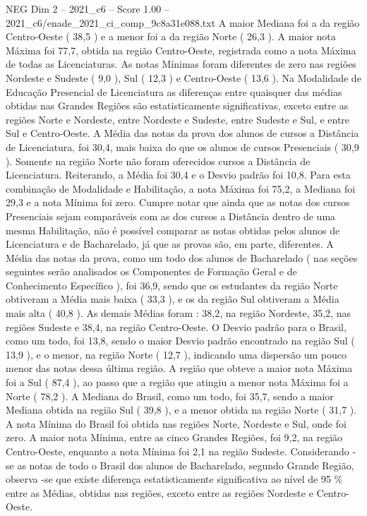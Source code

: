 \begin{textsample}{NEG Dim 2 – 2021\_c6 – Score 1.00 – 2021\_c6/enade\_2021\_ci\_comp\_9c8a31e088.txt}
A maior Mediana foi a da região Centro-Oeste ( 38,5 ) e a menor foi a da região Norte ( 26,3 ).
A maior nota Máxima foi 77,7, obtida na região Centro-Oeste, registrada como a nota Máxima de todas as Licenciaturas.
As notas Mínimas foram diferentes de zero nas regiões Nordeste e Sudeste ( 9,0 ), Sul ( 12,3 ) e Centro-Oeste ( 13,6 ).
Na Modalidade de Educação Presencial de Licenciatura as diferenças entre quaisquer das médias obtidas nas Grandes Regiões são estatisticamente significativas, exceto entre as regiões Norte e Nordeste, entre Nordeste e Sudeste, entre Sudeste e Sul, e entre Sul e Centro-Oeste.
A Média das notas da prova dos alunos de cursos a Distância de Licenciatura, foi 30,4, mais baixa do que os alunos de cursos Presenciais ( 30,9 ).
Somente na região Norte não foram oferecidos cursos a Distância de Licenciatura.
Reiterando, a Média foi 30,4 e o Desvio padrão foi 10,8.
Para esta combinação de Modalidade e Habilitação, a nota Máxima foi 75,2, a Mediana foi 29,3 e a nota Mínima foi zero.
Cumpre notar que ainda que as notas dos cursos Presenciais sejam comparáveis com as dos cursos a Distância dentro de uma mesma Habilitação, não é possível comparar as notas obtidas pelos alunos de Licenciatura e de Bacharelado, já que as provas são, em parte, diferentes.
A Média das notas da prova, como um todo dos alunos de Bacharelado ( nas seções seguintes serão analisados os Componentes de Formação Geral e de Conhecimento Específico ), foi 36,9, sendo que os estudantes da região Norte obtiveram a Média mais baixa ( 33,3 ), e os da região Sul obtiveram a Média mais alta ( 40,8 ).
As demais Médias foram : 38,2, na região Nordeste, 35,2, nas regiões Sudeste e 38,4, na região Centro-Oeste.
O Desvio padrão para o Brasil, como um todo, foi 13,8, sendo o maior Desvio padrão encontrado na região Sul ( 13,9 ), e o menor, na região Norte ( 12,7 ), indicando uma dispersão um pouco menor das notas dessa última região.
A região que obteve a maior nota Máxima foi a Sul ( 87,4 ), ao passo que a região que atingiu a menor nota Máxima foi a Norte ( 78,2 ).
A Mediana do Brasil, como um todo, foi 35,7, sendo a maior Mediana obtida na região Sul ( 39,8 ), e a menor obtida na região Norte ( 31,7 ).
A nota Mínima do Brasil foi obtida nas regiões Norte, Nordeste e Sul, onde foi zero.
A maior nota Mínima, entre as cinco Grandes Regiões, foi 9,2, na região Centro-Oeste, enquanto a nota Mínima foi 2,1 na região Sudeste.
Considerando -se as notas de todo o Brasil dos alunos de Bacharelado, segundo Grande Região, observa -se que existe diferença estatisticamente significativa ao nível de 95 \% entre as Médias, obtidas nas regiões, exceto entre as regiões Nordeste e Centro-Oeste.

\end{textsample}
